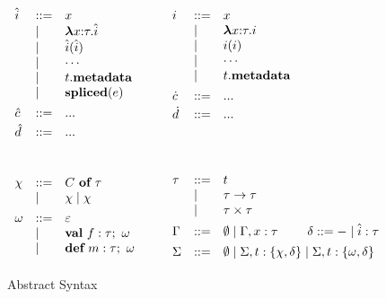 \begin{figure}[t]
\[\begin{array}[t]{lll}
\hat{i}    & \bnfdef & x \\
     & \bnfalt & \boldsymbol\lambda x{:}\tau . \hat{i} \\ %
     & \bnfalt & \hat{i}(\hat{i}) \\
     & \bnfalt & \cdots \\
     & \bnfalt & t.\keyw{metadata} \\
     & \bnfalt & \keyw{spliced}(e)
\\[1ex]
\hat c    & \bnfdef & ...
	 \\[.5ex]
\hat d   & \bnfdef & ... 
\\[1ex]
\\
\\
\chi & \bnfdef & C~\keyw{of}~\tau\\
     & \bnfalt & \chi \bnfalt \chi 
\\[1ex]
\omega &\bnfdef & \varepsilon \\  
         & \bnfalt & \keyw{val}~ f:\tau;~\omega\\
         & \bnfalt & \keyw{def}~ m:\tau;~\omega 
\\[1ex]
\end{array}
\begin{array}[t]{lll}
~~~
\end{array}
\begin{array}[t]{lll} 
i    & \bnfdef & x \\
     & \bnfalt & \boldsymbol\lambda x{:}\tau . i \\ %
     & \bnfalt & i(i) \\
     & \bnfalt & \cdots \\
     & \bnfalt & t.\keyw{metadata}
\\[1ex]
\dot{c}    & \bnfdef & ...
	 \\[.5ex]
\dot{d}   & \bnfdef & ... 
\\[1ex] 
\\
\\
\\
\tau & \bnfdef & t\\
     & \bnfalt & \tau \rightarrow \tau \\
     & \bnfalt & \tau \times \tau 
\\[1ex]
\Gamma & \bnfdef & \emptyset \bnfalt \Gamma, x:\tau~~~~~~~\delta \bnfdef - \bnfalt \hat{i} : \tau
\\[1ex]
\Sigma & \bnfdef & \emptyset \bnfalt \Sigma, t:\{\chi, \delta\} \bnfalt \Sigma, t:\{\omega, \delta\}
\end{array}
\]
\vspace{-12px}
\caption{Abstract Syntax}
\vspace{-15px}
\label{fig:core2-syntax}
\end{figure}



